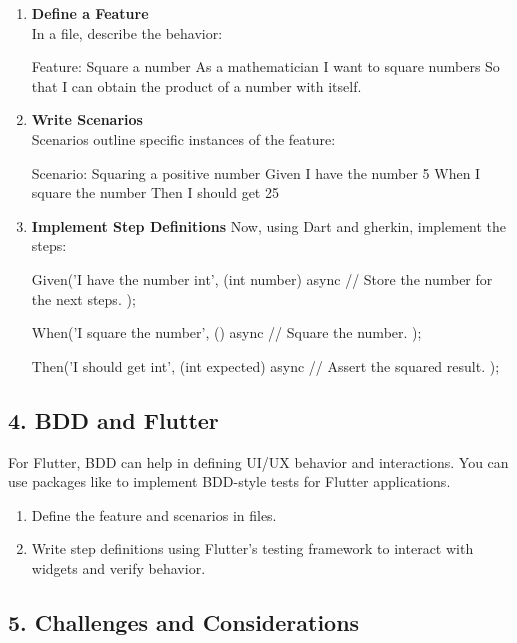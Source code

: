 \begin{enumerate}
 \item \textbf{Define a Feature} \\
 In a  file, describe the behavior:
\begin{yamlcode}
Feature: Square a number
  As a mathematician
  I want to square numbers
  So that I can obtain the product of a number with itself.
 \end{yamlcode}

 \item \textbf{Write Scenarios} \\
 Scenarios outline specific instances of the feature:

\begin{yamlcode}
Scenario: Squaring a positive number
  Given I have the number 5
  When I square the number
  Then I should get 25
 \end{yamlcode}

 \item \textbf{Implement Step Definitions}
 Now, using Dart and gherkin, implement the steps:

\begin{dartcode}
Given('I have the number {int}', (int number) async {
  // Store the number for the next steps.
});

When('I square the number', () async {
  // Square the number.
});

Then('I should get {int}', (int expected) async {
  // Assert the squared result.
});
\end{dartcode}
\end{enumerate}

\subsection*{4. BDD and Flutter}

For Flutter, BDD can help in defining UI/UX behavior and interactions. 
You can use packages like  to implement BDD-style tests for Flutter applications.

\begin{enumerate}
 \item Define the feature and scenarios in  files.
 \item Write step definitions using Flutter's testing framework to interact with widgets and verify behavior.
\end{enumerate}

\subsection*{5. Challenges and Considerations}

